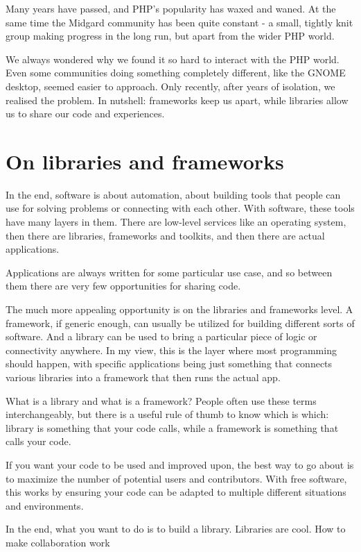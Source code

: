 Many years have passed, and PHP’s popularity has waxed and waned. At the same time the Midgard community has been quite constant - a small, tightly knit group making progress in the long run, but apart from the wider PHP world.

We always wondered why we found it so hard to interact with the PHP world. Even some communities doing something completely different, like the GNOME desktop, seemed easier to approach. Only recently, after years of isolation, we realised the problem. In nutshell: frameworks keep us apart, while libraries allow us to share our code and experiences.

\section*{On libraries and frameworks}

In the end, software is about automation, about building tools that people can use for solving problems or connecting with each other. With software, these tools have many layers in them. There are low-level services like an operating system, then there are libraries, frameworks and toolkits, and then there are actual applications.

Applications are always written for some particular use case, and so between them there are very few opportunities for sharing code.

The much more appealing opportunity is on the libraries and frameworks level. A framework, if generic enough, can usually be utilized for building different sorts of software. And a library can be used to bring a particular piece of logic or connectivity anywhere. In my view, this is the layer where most programming should happen, with specific applications being just something that connects various libraries into a framework that then runs the actual app.

What is a library and what is a framework? People often use these terms interchangeably, but there is a useful rule of thumb to know which is which: library is something that your code calls, while a framework is something that calls your code.

If you want your code to be used and improved upon, the best way to go about is to maximize the number of potential users and contributors. With free software, this works by ensuring your code can be adapted to multiple different situations and environments.

In the end, what you want to do is to build a library. Libraries are cool.
How to make collaboration work

